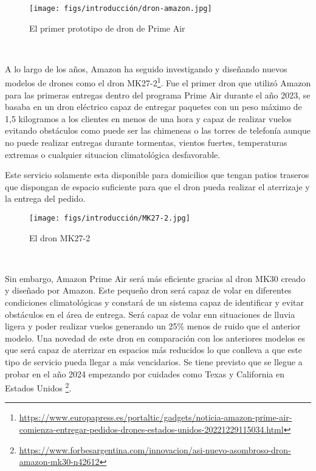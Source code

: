 \begin{figure} [H]
  \begin{center}
    \texttt{[image: figs/introducción/dron-amazon.jpg]}
  \end{center}
  \caption{El primer prototipo de dron de Prime Air}
  \label{fig:PrimerPrimeAir}
\end{figure}\

A lo largo de los años, Amazon ha seguido investigando y diseñando nuevos modelos de drones como el dron MK27-2\footnote{\url{https://www.europapress.es/portaltic/gadgets/noticia-amazon-prime-air-comienza-entregar-pedidos-drones-estados-unidos-20221229115034.html}}. Fue el primer 
dron que utilizó Amazon para 
las primeras entregas dentro del programa Prime Air durante el año 2023, se basaba en un dron eléctrico capaz de entregar paquetes con un peso máximo de 1,5 kilogramos a los clientes en menos de una
hora y capaz de realizar vuelos evitando obstáculos como puede ser las chimeneas o las torres de telefonía aunque no puede realizar entregas durante tormentas, vientos fuertes, temperaturas
extremas o cualquier situacion climatológica desfavorable. 

Este servicio solamente esta disponible para domicilios que tengan patios traseros que dispongan de espacio suficiente para que el dron pueda realizar el aterrizaje y la 
entrega del pedido.

\begin{figure} [H]
  \begin{center}
    \texttt{[image: figs/introducción/MK27-2.jpg]}
  \end{center}
  \caption{El dron MK27-2}
  \label{fig:MK27-2}
\end{figure}\

Sin embargo, Amazon Prime Air será más eficiente gracias al dron MK30 creado y diseñado por Amazon. Este pequeño dron será capaz de volar en diferentes condiciones climatológicas y 
constará de un sistema capaz de identificar y evitar obstáculos en el área de entrega. Será capaz de volar enn situaciones de lluvia ligera y poder realizar vuelos generando un 25\%
menos de ruido que el anterior modelo. Una novedad de este dron en comparación con los anteriores modelos es que será capaz de aterrizar en espacios más reducidos lo que conlleva a que
este tipo de servicio pueda llegar a más vencidarios. \newline
Se tiene previsto que se llegue a probar en el año 2024 empezando por cuidades como Texas y California en Estados Unidos
\footnote{\url{https://www.forbesargentina.com/innovacion/asi-nuevo-asombroso-dron-amazon-mk30-n42612}}. \newline


